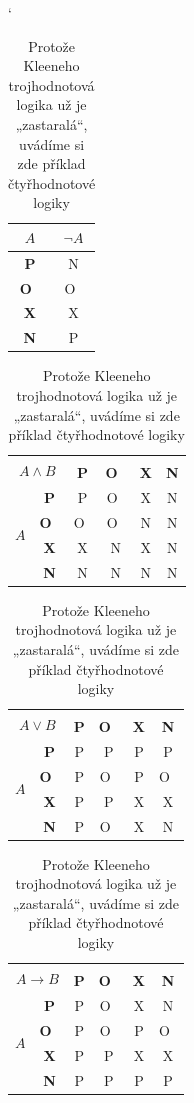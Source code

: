 \documentclass[11pt,a4paper]{article}
\providecommand{\uv}[1]{„#1“}
\begin{document}
\begin{table}[h]
\catcode`
\begin{center}
\begin{tabular}{| >{\bfseries}c | c |}\hline
$A$ & $\neg A$ \\\hline
P & N \\\hline
O~& O~\\\hline
X & X \\\hline
N & P \\\hline
\end{tabular}
\begin{tabular}{| c | >{\bfseries}c | c | c | c | c |}\hline
\multicolumn{2}{|c|}{\multirow{2}{*}{$A\wedge B$}} & \multicolumn{4}{c|}{$B$} \\ \cline{3-6} 
\multicolumn{2}{|c|}{} & \bfseries P & \bfseries O~& \bfseries X & \bfseries N \\ \hline
\multirow{4}{*}{$A$}& P & P & O~& X & N \\ \cline{2-6} 
                               & O~& O~& O~& N & N \\ \cline{2-6} 
                               & X & X & N & X & N \\ \cline{2-6} 
                               & N & N & N & N & N \\ \hline
\end{tabular}
\begin{tabular}{| c | >{\bfseries}c | c | c | c | c |}\hline
\multicolumn{2}{|c|}{\multirow{2}{*}{$A\vee B$}} & \multicolumn{4}{c|}{$B$} \\ \cline{3-6} 
\multicolumn{2}{|c|}{} & \bfseries P & \bfseries O~& \bfseries X & \bfseries N \\ \hline
\multirow{4}{*}{$A$}& P & P & P & P & P \\ \cline{2-6} 
                               & O~& P & O~& P & O~\\ \cline{2-6} 
                               & X & P & P & X & X \\ \cline{2-6} 
                               & N & P & O~& X & N \\ \hline
\end{tabular}
\begin{tabular}{| c | >{\bfseries}c | c | c | c | c |}\hline
\multicolumn{2}{|c|}{\multirow{2}{*}{$A\rightarrow B$}} & \multicolumn{4}{c|}{$B$} \\ \cline{3-6} 
\multicolumn{2}{|c|}{} & \bfseries P & \bfseries O~& \bfseries X & \bfseries N \\ \hline
\multirow{4}{*}{$A$}& P & P & O~& X & N \\ \cline{2-6} 
                               & O~& P & O~& P & O~\\ \cline{2-6} 
                               & X & P & P & X & X \\ \cline{2-6} 
                               & N & P & P & P & P \\ \hline
\end{tabular}
\caption{Protože Kleeneho trojhodnotová logika už je \uv{zastaralá}, uvádíme si zde příklad čtyřhodnotové
logiky}
\label{tabLogiky}
\end{center}
 \end{table}
\end{document}
